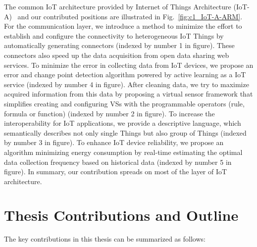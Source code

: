 The common IoT architecture provided by Internet of Things Architecture (IoT-A)~\cite{deinternet} and our contributed positions are illustrated in Fig.~\ref{fig:c1_IoT-A-ARM}. For the communication layer, we introduce a method to minimize the effort to establish and configure the connectivity to heterogeneous IoT Things by automatically generating connectors (indexed by number 1 in figure). These connectors also speed up the data acquisition from open data sharing web services. To minimize the error in collecting data from IoT devices, we propose an error and change point detection algorithm powered by active learning as a IoT service (indexed by number 4 in figure). After cleaning data, we try to maximize acquired information from this data by proposing a virtual sensor framework that simplifies creating and configuring VSs with the programmable operators (rule, formula or function) (indexed by number 2 in figure). To increase the interoperability for IoT applications, we provide a descriptive language, which semantically describes not only single Things but also group of Things (indexed by number 3 in figure). To enhance IoT device reliability, we propose an algorithm minimizing energy consumption by real-time estimating the optimal data collection frequency based on historical data (indexed by number 5 in figure). In summary, our contribution spreads on most of the layer of IoT architecture. 



 

\section{Thesis Contributions and Outline}
The key contributions in this thesis can be summarized as follows:
